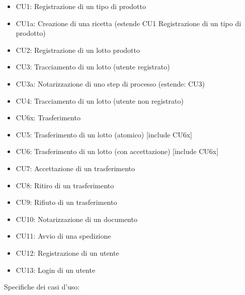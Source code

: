 \documentclass[a4paper,11pt]{article}
\begin{document}
\begin{itemize}
  \item CU1: Registrazione di un tipo di prodotto
  \item CU1a: Creazione di una ricetta (estende CU1 Registrazione di un tipo di prodotto)
  \item CU2: Registrazione di un lotto prodotto
  \item CU3: Tracciamento di un lotto (utente registrato)
  \item CU3a: Notarizzazione di uno step di processo (estende: CU3)
  \item CU4: Tracciamento di un lotto (utente non registrato)
  \item CU6x: Trasferimento
  \item CU5: Trasferimento di un lotto (atomico) [include CU6x]
  \item CU6: Trasferimento di un lotto (con accettazione) [include CU6x]
  \item CU7: Accettazione di un trasferimento
  \item CU8: Ritiro di un trasferimento
  \item CU9: Rifiuto di un trasferimento
  \item CU10: Notarizzazione di un documento
  \item CU11: Avvio di una spedizione
  \item CU12: Registrazione di un utente
  \item CU13: Login di un utente
\end{itemize}

Specifiche dei casi d'uso:
\end{document}
